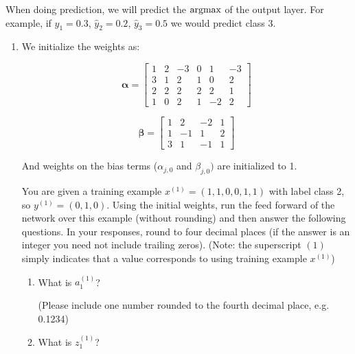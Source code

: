 When doing prediction, we will predict the $\operatorname*{argmax}$ of the output layer. For example, if $\hat{y}_1=0.3$, $\hat{y}_2=0.2$, $\hat{y}_3=0.5$ we would predict class 3.

\begin{enumerate} 
\item {}
     We initialize the weights as:
\begin{center}
$$\boldsymbol{\alpha}=
    \begin{bmatrix}
    1 & 2 & -3 & 0 & 1 & -3 \\
    3 & 1 & 2 & 1 & 0 & 2 \\
    2 & 2 & 2 & 2 & 2 & 1 \\
    1 & 0 & 2 & 1 & -2 & 2
    \end{bmatrix}$$
    
$$\boldsymbol{\beta}=
    \begin{bmatrix}
    1 & 2 & -2 & 1 \\
    1 & -1 & 1 & 2 \\
    3 & 1 & -1 & 1
    \end{bmatrix}
$$
\end{center}
    
And weights on the bias terms (${\alpha}_{j,0}$ and ${\beta}_{j,0})$ are initialized to 1.
    
    You are given a training example $x^{(1)}=(1,1,0,0,1,1)$ with label class 2, so $y^{(1)}=(0,1,0)$. Using the initial weights, run the feed forward of the network over this example (without rounding) and then answer the following questions. In your responses, round to four decimal places (if the answer is an integer you need not include trailing zeros). (Note: the superscript $(1)$ simply indicates that a value corresponds to using training example $x^{(1)}$)
    
    \begin{enumerate}
        \item What is $a^{(1)}_1$?
        
        (Please include one number rounded to the fourth decimal place, e.g. 0.1234)
    
        \begin{tcolorbox}[fit,height=1cm,blank, borderline={1pt}{-2pt},nobeforeafter]
        \end{tcolorbox}
        
        \item What is $z^{(1)}_1$?
        

\end{enumerate}
\end{enumerate}
